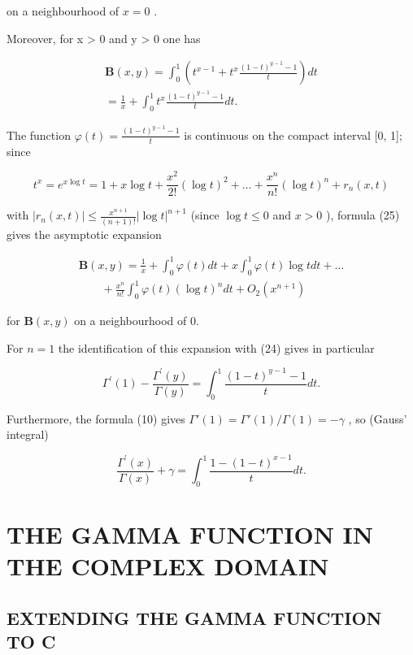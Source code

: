 on a neighbourhood of \(x = 0\) .

Moreover, for x \textgreater{} 0 and y \textgreater{} 0 one has

\[
\begin{array}{l} \mathbf {B} (x, y) = \int_ {0} ^ {1} \left(t ^ {x - 1} + t ^ {x} \frac {(1 - t) ^ {y - 1} - 1}{t}\right) d t \\ = \frac {1}{x} + \int_ {0} ^ {1} t ^ {x} \frac {(1 - t) ^ {y - 1} - 1}{t} d t. \end{array}\tag{25}
\]

The function \(\varphi(t) = \frac{(1 - t)^{y - 1} - 1}{t}\) is continuous on the compact interval {[}0, 1{]}; since

\[
t ^ {x} = e ^ {x \log t} = 1 + x \log t + \frac {x ^ {2}}{2 !} (\log t) ^ {2} + \dots + \frac {x ^ {n}}{n !} (\log t) ^ {n} + r _ {n} (x, t)
\]

with \(|r_n(x,t)| \leqslant \frac{x^{n+1}}{(n+1)!} |\log t|^{n+1}\) (since \(\log t \leqslant 0\) and \(x > 0\) ), formula (25) gives the asymptotic expansion

\[
\begin{array}{l} \mathbf {B} (x, y) = \frac {1}{x} + \int_ {0} ^ {1} \varphi (t) d t + x \int_ {0} ^ {1} \varphi (t) \log t d t + \dots \\ \qquad + \frac {x ^ {n}}{n !} \int_ {0} ^ {1} \varphi (t) (\log t) ^ {n} d t + O _ {2} (x ^ {n + 1}) \end{array}
\]

for \(\mathbf{B}(x,y)\) on a neighbourhood of 0.

For \(n = 1\) the identification of this expansion with (24) gives in particular

\[
\Gamma^ {\prime} (1) - \frac {\Gamma^ {\prime} (y)}{\Gamma (y)} = \int_ {0} ^ {1} \frac {(1 - t) ^ {y - 1} - 1}{t} d t.
\]

Furthermore, the formula (10) gives \(\Gamma'(1) = \Gamma'(1)/\Gamma(1) = -\gamma\) , so (Gauss' integral)

\[
\frac {\Gamma^ {\prime} (x)}{\Gamma (x)} + \gamma = \int_ {0} ^ {1} \frac {1 - (1 - t) ^ {x - 1}}{t} d t.\tag{26}
\]

\section{THE GAMMA FUNCTION IN THE COMPLEX DOMAIN}

\subsection{EXTENDING THE GAMMA FUNCTION TO C}

